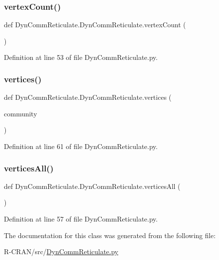 \subsubsection{\texorpdfstring{vertex\+Count()}{vertexCount()}}
{\footnotesize\ttfamily def Dyn\+Comm\+Reticulate.\+Dyn\+Comm\+Reticulate.\+vertex\+Count (\begin{DoxyParamCaption}{ }\end{DoxyParamCaption})}



Definition at line 53 of file Dyn\+Comm\+Reticulate.\+py.

\mbox{\label{classDynCommReticulate_1_1DynCommReticulate_ab8c90f44f7428518072a0a69f5684f29}} 
\subsubsection{\texorpdfstring{vertices()}{vertices()}}
{\footnotesize\ttfamily def Dyn\+Comm\+Reticulate.\+Dyn\+Comm\+Reticulate.\+vertices (\begin{DoxyParamCaption}\item[{}]{community }\end{DoxyParamCaption})}



Definition at line 61 of file Dyn\+Comm\+Reticulate.\+py.

\mbox{\label{classDynCommReticulate_1_1DynCommReticulate_ad09ca5295a25f2c5246c56c39ef13bfc}} 
\subsubsection{\texorpdfstring{vertices\+All()}{verticesAll()}}
{\footnotesize\ttfamily def Dyn\+Comm\+Reticulate.\+Dyn\+Comm\+Reticulate.\+vertices\+All (\begin{DoxyParamCaption}{ }\end{DoxyParamCaption})}



Definition at line 57 of file Dyn\+Comm\+Reticulate.\+py.



The documentation for this class was generated from the following file\+:\begin{DoxyCompactItemize}
\item 
R-\/\+C\+R\+A\+N/src/\hyperlink{DynCommReticulate_8py}{Dyn\+Comm\+Reticulate.\+py}\end{DoxyCompactItemize}

